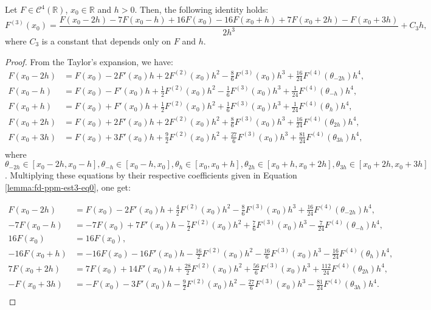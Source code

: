 \begin{lema}
	\label{lemma:fd-ppm-est3}
	Let $F \in \mathcal{C}^{4}(\mathbb{R})$, $x_0 \in \mathbb{R}$ and $h>0$.
	Then, the following identity holds:
	\begin{equation}	
		\label{lemma:fd-ppm-est3-eq0}
		F^{(3)}(x_0) =  \frac{F(x_0-2h) - 7F(x_0-h) +16F(x_0) - 16F(x_0+h) +7F(x_0+2h) - F(x_0+3h)}{2h^3}
		      + C_3h,
	\end{equation}
	where $C_3$ is a constant that depends only on $F$ and $h$.
\end{lema}

\begin{proof}
From the Taylor's expansion, we have:
	\begin{align*}
		F(x_0-2h) &= F(x_0) - 2F'(x_0)h +           2F^{(2)}(x_0)h^2  - \frac{8}{6}F^{(3)}(x_0)h^3 + \frac{16}{24}F^{(4)}(\theta_{-2h})h^4,\\
		F(x_0-h)  &= F(x_0) -  F'(x_0)h +  \frac{1}{2}F^{(2)}(x_0)h^2 - \frac{1}{6}F^{(3)}(x_0)h^3 + \frac{1}{24}F^{(4)}(\theta_{-h})h^4, \\
		F(x_0+h)  &= F(x_0) +  F'(x_0)h +  \frac{1}{2}F^{(2)}(x_0)h^2 + \frac{1}{6}F^{(3)}(x_0)h^3 + \frac{1}{24}F^{(4)}(\theta_{h})h^4, \\
		F(x_0+2h) &= F(x_0) + 2F'(x_0)h +           2F^{(2)}(x_0)h^2  + \frac{8}{6}F^{(3)}(x_0)h^3 + \frac{16}{24}F^{(4)}(\theta_{2h})h^4,\\
		F(x_0+3h) &= F(x_0) + 3F'(x_0)h + \frac{9}{2}F^{(2)}(x_0)h^2  + \frac{27}{6}F^{(3)}(x_0)h^3+ \frac{81}{24}F^{(4)}(\theta_{3h})h^4,\\
	\end{align*}
	where $ \theta_{-2h}\in [x_0-2h,x_0-h], \theta_{-h}\in [x_0-h,x_0], \theta_{h} \in [x_0,x_0+h], 
	\theta_{2h} \in [x_0+h,x_0+2h], \theta_{3h}\in [x_0+2h,x_0+3h]$. 
	Multiplying these equations by their respective coefficients given in 
	Equation \eqref{lemma:fd-ppm-est3-eq0}, one get:
	
	\begin{align*}
		  F(x_0-2h) &=    F(x_0)  - 2F'(x_0)h  + \frac{4}{2}F^{(2)}(x_0)h^2  - \frac{8}{6}F^{(3)}(x_0)h^3 + \frac{16}{24}F^{(4)}(\theta_{-2h})h^4,\\
		 -7F(x_0-h)  &=  -7F(x_0) + 7F'(x_0)h  - \frac{7}{2}F^{(2)}(x_0)h^2 + \frac{7}{6}F^{(3)}(x_0)h^3 - \frac{7}{24}F^{(4)}(\theta_{-h})h^4,\\
		 16F(x_0)    &=  16F(x_0),\\
		-16F(x_0+h)  &= -16F(x_0) -16F'(x_0)h  - \frac{16}{2}F^{(2)}(x_0)h^2  - \frac{16}{6}F^{(3)}(x_0)h^3 - \frac{16}{24}F^{(4)}(\theta_{h})h^4,\\
		  7F(x_0+2h) &=   7F(x_0)  +14F'(x_0)h + \frac{28}{2}F^{(2)}(x_0)h^2  + \frac{56}{6}F^{(3)}(x_0)h^3 + \frac{112}{24}F^{(4)}(\theta_{2h})h^4,\\
		  -F(x_0+3h) &=   -F(x_0) - 3F'(x_0)h - \frac{9}{2}F^{(2)}(x_0)h^2  - \frac{27}{6}F^{(3)}(x_0)h^3 - \frac{81}{24}F^{(4)}(\theta_{3h})h^4.\\
	\end{align*}
	

\end{proof}
